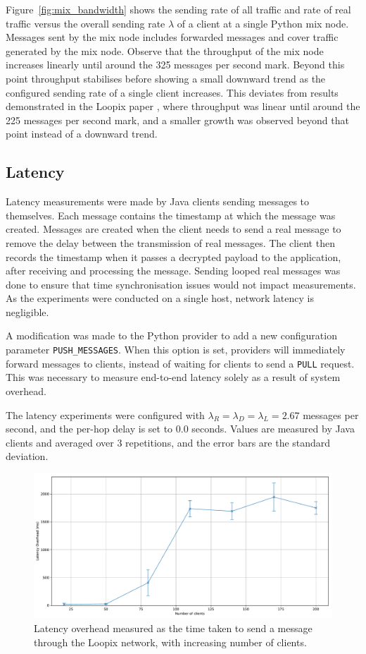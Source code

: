 \documentclass[final,dissertation.tex]{subfiles}
\begin{document}
Figure~\ref{fig:mix_bandwidth} shows the sending rate of all traffic and rate of real traffic versus the overall sending rate $\lambda$ of a client at a single Python mix node. Messages sent by the mix node includes forwarded messages and cover traffic generated by the mix node. Observe that the throughput of the mix node increases linearly until around the 325 messages per second mark. Beyond this point throughput stabilises before showing a small downward trend as the configured sending rate of a single client increases. This deviates from results demonstrated in the Loopix paper \cite{piotrowska2017loopix}, where throughput was linear until around the 225 messages per second mark, and a smaller growth was observed beyond that point instead of a downward trend.

\subsection{Latency}

Latency measurements were made by Java clients sending messages to themselves. Each message contains the timestamp at which the message was created. Messages are created when the client needs to send a real message to remove the delay between the transmission of real messages. The client then records the timestamp when it passes a decrypted payload to the application, after receiving and processing the message. Sending looped real messages was done to ensure that time synchronisation issues would not impact measurements. As the experiments were conducted on a single host, network latency is negligible.

A modification was made to the Python provider to add a new configuration parameter \verb|PUSH_MESSAGES|. When this option is set, providers will immediately forward messages to clients, instead of waiting for clients to send a \verb|PULL| request. This was necessary to measure end-to-end latency solely as a result of system overhead.

The latency experiments were configured with $\lambda_R = \lambda_D = \lambda_L = 2.67$ messages per second, and the per-hop delay is set to $0.0$ seconds. Values are measured by Java clients and averaged over 3 repetitions, and the error bars are the standard deviation.

\begin{figure}[h]
	\includegraphics[width=\linewidth]{../figs/client_latency}
	\caption{Latency overhead measured as the time taken to send a message through the Loopix network, with increasing number of clients.}
	\label{fig:client_latency}
\end{figure}
\end{document}
